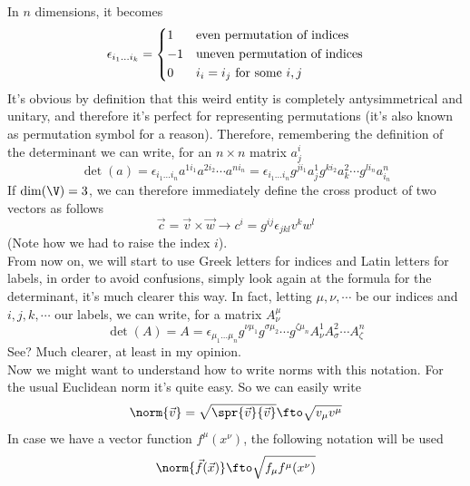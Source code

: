\documentclass[../mmf.tex]{subfiles}
\begin{document}
In $n$ dimensions, it becomes
\begin{equation}
	\epsilon_{i_1\ldots i_k}=\begin{dcases}1&\text{even permutation of indices}\\-1&\text{uneven permutation of indices}\\0&i_i=i_j\text{ for some }i,j\end{dcases}
	\label{eq:ndlc}
\end{equation}
It's obvious by definition that this weird entity is completely antysimmetrical and unitary, and therefore it's perfect for representing permutations (it's also known as permutation symbol for a reason). Therefore, remembering the definition of the determinant we can write, for an $n\times n$ matrix $a^i_j$
\begin{equation}
	\det(a)=\epsilon_{i_1\ldots i_n}a^{1i_1}a^{2i_2}\cdots a^{ni_n}=\epsilon_{i_1\ldots i_n}g^{ji_1}a^1_{j}g^{ki_2}a^2_{k}\cdots g^{li_n}a^n_{i_n}
	\label{eq:determinanteinnot}
\end{equation}
If $\dim(\V)=3$, we can therefore immediately define the cross product of two vectors as follows
\begin{equation}
	\vec{c}=\vec{v}\times\vec{w}\longrightarrow c^i=g^{ij}\epsilon_{jkl}v^kw^l
	\label{eq:crossproducteinst}
\end{equation}
(Note how we had to raise the index $i$).\\
From now on, we will start to use Greek letters for indices and Latin letters for labels, in order to avoid confusions, simply look again at the formula for the determinant, it's much clearer this way. In fact, letting $\mu,\nu,\cdots$ be our indices and $i,j,k,\cdots$ our labels, we can write, for a matrix $A^\mu_\nu$
\begin{equation}
	\det(A)=A=\epsilon_{\mu_1\ldots \mu_n}g^{\nu\mu_1}g^{\sigma\mu_2}\cdots g^{\zeta\mu_{n}}A^1_{\nu}A^2_\sigma\cdots A^n_\zeta
	\label{eq:greekdeterminant}
\end{equation}
See? Much clearer, at least in my opinion.\\
Now we might want to understand how to write norms with this notation. For the usual Euclidean norm it's quite easy. So we can easily write
\begin{equation}
	\norm{\vec{v}}=\sqrt{\spr{\vec{v}}{\vec{v}}}\fto\sqrt{v_\mu v^\mu}
	\label{eq:2normein}
\end{equation}
In case we have a vector function $f^\mu(x^\nu)$, the following notation will be used
\begin{equation}
	\norm{\vec{f}(\vec{x})}\fto \sqrt{f_\mu f^\mu(x^\nu)}
	\label{eq:fnormein}
\end{equation}
\end{document}
